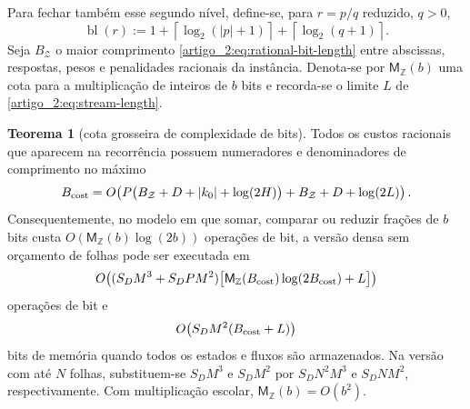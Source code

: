 \documentclass[12pt,a4paper]{article}
\theoremstyle{preciso}
\theoremstyle{definition}
\theoremstyle{preciso}
\newtheorem{theorem}[teorema]{Teorema}
\theoremstyle{preciso}
\theoremstyle{preciso}
\theoremstyle{preciso}
\theoremstyle{definition}
\theoremstyle{preciso}
\theoremstyle{definition}
\theoremstyle{preciso}
\theoremstyle{preciso}
\theoremstyle{definition}
\newcounter{absc}
\begin{document}
Para fechar também esse segundo nível, define-se, para $r=p/q$ reduzido, $q>0$,
\begin{equation}
 \operatorname{bl}(r)
 :=1+\left\lceil\log_2(|p|+1)\right\rceil
    +\left\lceil\log_2(q+1)\right\rceil .
 \label{artigo_2:eq:rational-bit-length}
\end{equation}
Seja $B_{\mathcal Z}$ o maior comprimento \eqref{artigo_2:eq:rational-bit-length}
entre abscissas, respostas, pesos e penalidades racionais da instância. Denota-se
por $\mathsf M_{\mathbb Z}(b)$ uma cota para a multiplicação de inteiros de $b$ bits
e recorda-se o limite $L$ de \eqref{artigo_2:eq:stream-length}.

\begin{theorem}[cota grosseira de complexidade de bits]\label{map:artigo_2:9.3}
\label{artigo_2:thm:bit-complexity}
Todos os custos racionais que aparecem na recorrência possuem numeradores e
denominadores de comprimento no máximo
\begin{equation}
 B_{\rm cost}
 =O\!\left(
 P\bigl(B_{\mathcal Z}+D+|k_0|+\log(2H)\bigr)
 +B_{\mathcal Z}+D+\log(2L)
 \right).
 \label{artigo_2:eq:cost-bit-growth}
\end{equation}
Consequentemente, no modelo em que somar, comparar ou reduzir frações de $b$ bits custa $O(\mathsf M_{\mathbb Z}(b)\log(2b))$ operações de bit, a versão densa sem orçamento de folhas pode ser executada em
\begin{equation}
 O\!\left(
 (S_DM^3+S_DPM^2)
 \bigl[\mathsf M_{\mathbb Z}(B_{\rm cost})
       \log(2B_{\rm cost})+L\bigr]
 \right)
 \label{artigo_2:eq:dense-bit-time}
\end{equation}
operações de bit e
\begin{equation}
 O\!\left(S_DM^2(B_{\rm cost}+L)\right)
 \label{artigo_2:eq:dense-bit-memory}
\end{equation}
bits de memória quando todos os estados e fluxos são armazenados. Na versão
com até $N$ folhas, substituem-se $S_DM^3$ e $S_DM^2$ por
$S_DN^2M^3$ e $S_DNM^2$, respectivamente. Com multiplicação escolar,
$\mathsf M_{\mathbb Z}(b)=O(b^2)$.
\end{theorem}
\end{document}

